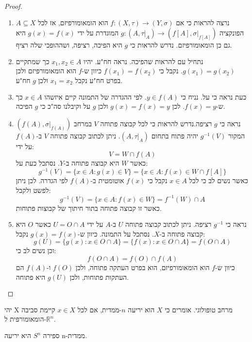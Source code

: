\documentclass{tstextbook}
\begin{document}
\begin{proof}
  \begin{enumerate}
    \item נרצה להראות כי אם \(f:(X,\tau)\to(Y,\sigma)\) הוא הומאומורפיזם, אז לכל \(A\subseteq X\) הפונקציה \(g:(A,\tau|_{A})\to(f[A],\sigma|_{f[A]})\) המוגדרת על ידי \(g(x)=f(x)\) היא גם כן הומאומורפיזם. נדרש להראות כי \(g\) היא הפיכה, רציפה, ושההופכי שלה רציף. 


    \item נתחיל עם להראות שהפיכה. נראה חח"ע. יהיו \(x_{1},x_{2}\in A\) כך שמתקיים \(g(x_{1})=g(x_{2})\). נקבל כי \(f(x_{1})=f(x_{2})\) כיוון ש-\(f\) הוא הומאומורפיזם ולכן בפרט חח"ע נקבל \(x_{1}=x_{2}\) ולכן \(g\) חח"ע. 


    \item כעת נראה כי על. נניח כי \(y \in f(A)\). לפי ההגדרה של התמונה קיים איזשהו \(x \in A\) כך ש-\(f(x)=y\). לכן \(g(x)=f(x)=y\) ולכן \(g\) על וקיבלנו סה"כ כי \(g\) הפיכה. 


    \item נראה כי \(g\) רציפה.נדרש להראות כי לכל קבוצה פתוחה \(V\) במרחב \((f(A),\sigma|_{f(A)})\) המקור \(g^{-1}(V)\) יהיה פתוח בתחום \((A,\tau|_{A})\). ניתן לכתוב קבוצה פתוחה \(V\) ב-\(f(A)\) על ידי: 
$$V=W\cap f(A)$$
כאשר \(W\) היא קבוצה פתוחה ב-\(Y\).  נסתכל כעת על:
$$g^{-1}(V)=\{x\in A:g(x)\in V\}=\{x\in A:f(x)\in W\cap f[A]\}$$
כאשר נשים לב כי לכל \(x \in A\) נקבל כי \(f(x)\) אוטומטית ב-\(f(A)\) לפי הגדרה. לכן ניתן לפשט ולקבל:
$$g^{-1}(V)=\{x\in A:f(x)\in W\}=f^{-1}(W)\cap A$$
כאשר זו קבוצה פתוחה בתור חיתוך של קבוצות פתוחות.


    \item נראה כי \(g^{-1}\) רציפה. ניתן לכתוב קבוצה פתוחה \(U\) ב-\(A\) על ידי \(U=O\cap A\) כאשר \(O\) היא קבוצה פתוחה ב-\(X\). נסתכל על התמונה. כיוון ש-\(g(x)=f(x)\) נקבל: 
$$g(U)=\{g(x):x\in O\cap A\}=\{f(x):x\in O\cap A\}=f(O\cap A)$$
וכן נשים לב כי:
$$f(O\cap A)=f(O)\cap f(A)$$
כיוון ש-\(f\) הוא הומאומורפיזם, הוא בפרט העתקה פתוחה, ולכן \(f(O)\) ו-\(f(A)\) הם העתקות פתוחות, ולכן \(g(U)\) היא פתוחה.


  \end{enumerate}
\end{proof}
\begin{definition}
יהי X מרחב טופולוגי. אומרים כי \(X\) הוא יריעה \(n\)-ממדית, אם לכל \(x\in X\) קיימת סביבה הומאומורפית ל-\(\mathbb{R}^n\).

\end{definition}
\begin{example}
ספירה \(S^{n}\) היא יריעה n-ממדית.

\end{example}
\end{document}
